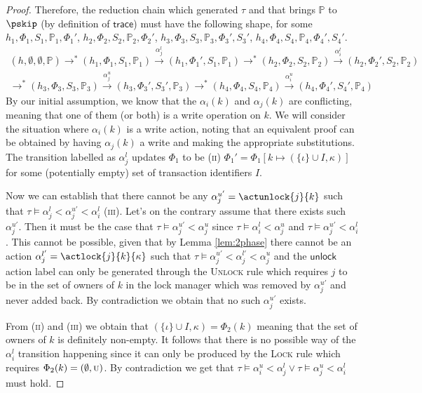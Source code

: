 \begin{proof}
Therefore, the reduction chain which generated $\tau$ and that brings $\mathds{P}$ to $\pskip$ (by definition of $\mathsf{trace}$) must have the following shape, for some $h_1, \Phi_1, S_1, \mathds{P}_1, \Phi_1'$, $h_2, \Phi_2, S_2, \mathds{P}_2, \Phi_2'$, $h_3, \Phi_3, S_3, \mathds{P}_3, \Phi_3', S_3'$, $h_4, \Phi_4, S_4, \mathds{P}_4, \Phi_4', S_4'$.
\begin{gather*}
(h, \emptyset, \emptyset, \mathds{P}) \rightarrow^* (h_1, \Phi_1, S_1, \mathds{P}_1) \xrightarrow{\alpha_j^l} (h_1, \Phi_1', S_1, \mathds{P}_1) \rightarrow^* (h_2, \Phi_2, S_2, \mathds{P}_2) \xrightarrow{\alpha_i^l} (h_2, \Phi_2', S_2, \mathds{P}_2)
\\
\rightarrow^* (h_3, \Phi_3, S_3, \mathds{P}_3) \xrightarrow{\alpha_j^u} (h_3, \Phi_3', S_3', \mathds{P}_3) \rightarrow^* (h_4, \Phi_4, S_4, \mathds{P}_4) \xrightarrow{\alpha_i^u} (h_4, \Phi_4', S_4', \mathds{P}_4)
\end{gather*}
By our initial assumption, we know that the $\alpha_i(k)$ and $\alpha_j(k)$ are conflicting, meaning that one of them (or both) is a write operation on $k$. We will consider the situation where $\alpha_i(k)$ is a write action, noting that an equivalent proof can be obtained by having $\alpha_j(k)$ a write and making the appropriate substitutions. The transition labelled as $\alpha_j^l$ updates $\Phi_1$ to be (\textsc{ii}) $\Phi_1' = \Phi_1[k \mapsto (\{\iota\} \cup I, \kappa)]$ for some (potentially empty) set of transaction identifiers $I$.

Now we can establish that there cannot be any $\alpha_j^{u'} = \actunlock{j}{k}$ such that $\tau \vDash \alpha_j^l < \alpha_j^{u'} < \alpha_i^l$ (\textsc{iii}). Let's on the contrary assume that there exists such $\alpha_j^{u'}$. Then it must be the case that $\tau \vDash \alpha_j^{u'} < \alpha_j^{u}$ since $\tau \vDash \alpha_i^l < \alpha_j^u$ and $\tau \vDash \alpha_j^{u'} < \alpha_i^l$. This cannot be possible, given that by Lemma \ref{lem:2phase} there cannot be an action $\alpha_j^{l'} = \actlock{j}{k}{\kappa}$ such that $\tau \vDash \alpha_j^{u'} < \alpha_j^{l'} < \alpha_j^{u}$ and the $\mathsf{unlock}$ action label can only be generated through the \textsc{Unlock} rule which requires $j$ to be in the set of owners of $k$ in the lock manager which was removed by $\alpha_j^{u'}$ and never added back. By contradiction we obtain that no such $\alpha_j^{u'}$ exists.

From (\textsc{ii}) and (\textsc{iii}) we obtain that $(\{\iota\} \cup I, \kappa) = \Phi_2(k)$ meaning that the set of owners of $k$ is definitely non-empty. It follows that there is no possible way of the $\alpha_i^l$ transition happening since it can only be produced by the \textsc{Lock} rule which requires $\Phi_2(k) = (\emptyset, \textsc{u})$. By contradiction we get that $\tau \vDash \alpha_i^u < \alpha_j^l  \lor \tau \vDash \alpha_j^u < \alpha_i^l$ must hold.
\end{proof}